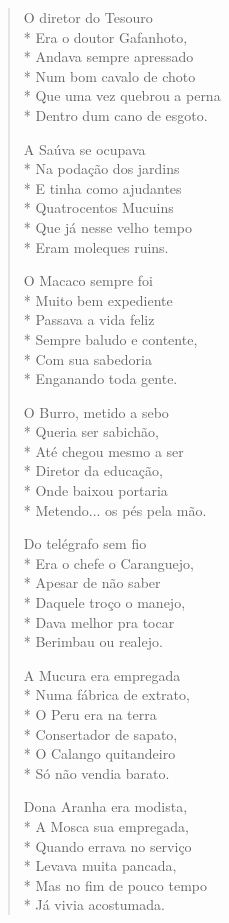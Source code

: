 \begin{verse}
O diretor do Tesouro\\*
Era o doutor Gafanhoto,\\*
Andava sempre apressado\\*
Num bom cavalo de choto\\*
Que uma vez quebrou a perna\\*
Dentro dum cano de esgoto.

A Saúva se ocupava\\*
Na podação dos jardins\\*
E tinha como ajudantes\\*
Quatrocentos Mucuins\\*
Que já nesse velho tempo\\*
Eram moleques ruins.

O Macaco sempre foi\\*
Muito bem expediente\\*
Passava a vida feliz\\*
Sempre baludo e contente,\\*
Com sua sabedoria\\*
Enganando toda gente.

O Burro, metido a sebo\\*
Queria ser sabichão,\\*
Até chegou mesmo a ser\\*
Diretor da educação,\\*
Onde baixou portaria\\*
Metendo... os pés pela mão.

Do telégrafo sem fio\\*
Era o chefe o Caranguejo,\\*
Apesar de não saber\\*
Daquele troço o manejo,\\*
Dava melhor pra tocar\\*
Berimbau ou realejo.

A Mucura era empregada\\*
Numa fábrica de extrato,\\*
O Peru era na terra\\*
Consertador de sapato,\\*
O Calango quitandeiro\\*
Só não vendia barato.

Dona Aranha era modista,\\*
A Mosca sua empregada,\\*
Quando errava no serviço\\*
Levava muita pancada,\\*
Mas no fim de pouco tempo\\*
Já vivia acostumada.


\end{verse}
